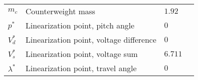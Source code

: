 \begin{table}[h!]
\begin{tabular}{llll}
  		$m_{c}$     & Counterweight mass                              & $1.92$  & \kilogram                   \\
  		$p^\ast$    & Linearization point, pitch angle                & $0$     & \rad                        \\
  		$V_d^\ast$  & Linearization point, voltage difference         & $0$     & \volt                       \\
  		$V_s^\ast$  & Linearization point, voltage sum                & $6.711$ & \volt                       \\
  		$\lambda^\ast$    & Linearization point, travel angle         & $0$     & \rad                        \\
		\bottomrule
	\end{tabular}
\label{tab:constans}
\end{table}


